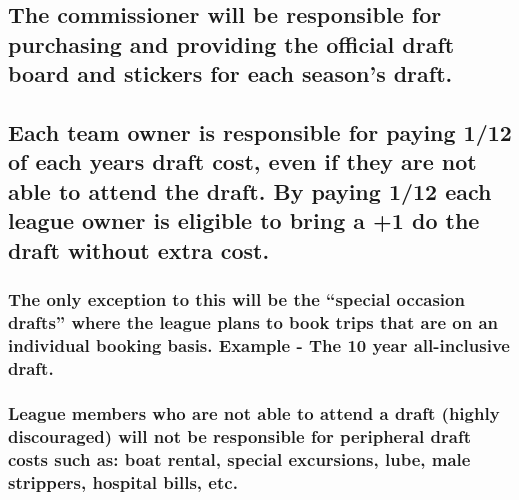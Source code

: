 \documentclass[]{book}
\begin{document}
\hypertarget{the-commissioner-will-be-responsible-for-purchasing-and-providing-the-official-draft-board-and-stickers-for-each-seasons-draft.}{%
\subsection{The commissioner will be responsible for purchasing and providing the official draft board and stickers for each season's draft.}\label{the-commissioner-will-be-responsible-for-purchasing-and-providing-the-official-draft-board-and-stickers-for-each-seasons-draft.}}

\hypertarget{each-team-owner-is-responsible-for-paying-112-of-each-years-draft-cost-even-if-they-are-not-able-to-attend-the-draft.-by-paying-112-each-league-owner-is-eligible-to-bring-a-1-do-the-draft-without-extra-cost.}{%
\subsection{Each team owner is responsible for paying 1/12 of each years draft cost, even if they are not able to attend the draft. By paying 1/12 each league owner is eligible to bring a +1 do the draft without extra cost.}\label{each-team-owner-is-responsible-for-paying-112-of-each-years-draft-cost-even-if-they-are-not-able-to-attend-the-draft.-by-paying-112-each-league-owner-is-eligible-to-bring-a-1-do-the-draft-without-extra-cost.}}

\hypertarget{the-only-exception-to-this-will-be-the-special-occasion-drafts-where-the-league-plans-to-book-trips-that-are-on-an-individual-booking-basis.-example---the-10-year-all-inclusive-draft.}{%
\subsubsection{The only exception to this will be the ``special occasion drafts'' where the league plans to book trips that are on an individual booking basis. Example - The 10 year all-inclusive draft.}\label{the-only-exception-to-this-will-be-the-special-occasion-drafts-where-the-league-plans-to-book-trips-that-are-on-an-individual-booking-basis.-example---the-10-year-all-inclusive-draft.}}

\hypertarget{league-members-who-are-not-able-to-attend-a-draft-highly-discouraged-will-not-be-responsible-for-peripheral-draft-costs-such-as-boat-rental-special-excursions-lube-male-strippers-hospital-bills-etc.}{%
\subsubsection{League members who are not able to attend a draft (highly discouraged) will not be responsible for peripheral draft costs such as: boat rental, special excursions, lube, male strippers, hospital bills, etc.}\label{league-members-who-are-not-able-to-attend-a-draft-highly-discouraged-will-not-be-responsible-for-peripheral-draft-costs-such-as-boat-rental-special-excursions-lube-male-strippers-hospital-bills-etc.}}
\end{document}
